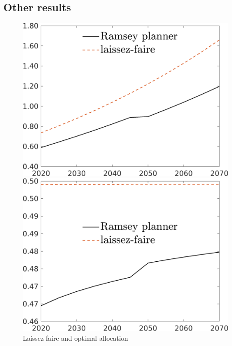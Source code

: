 \subsection{Other results}
\begin{figure}[h!!]
	\centering
	\caption{Laissez-faire and optimal allocation }\label{fig:LF}
	\begin{minipage}[]{0.32\textwidth}
		\includegraphics[width=1\textwidth]{../../codding_model/own_basedOnFried/optimalPol_190722_tidiedUp/figures/all_10Aout22/C_LFCompOPT_T_NoTaus_regime3_spillover0_noskill0_sep1_xgrowth0_etaa0.79_lgd1.png}
	\end{minipage}
	\begin{minipage}[]{0.32\textwidth}
	\includegraphics[width=1\textwidth]{../../codding_model/own_basedOnFried/optimalPol_190722_tidiedUp/figures/all_10Aout22/hh_LFCompOPT_T_NoTaus_regime3_spillover0_noskill0_sep1_xgrowth0_etaa0.79_lgd1.png}
\end{minipage}
\end{figure}

